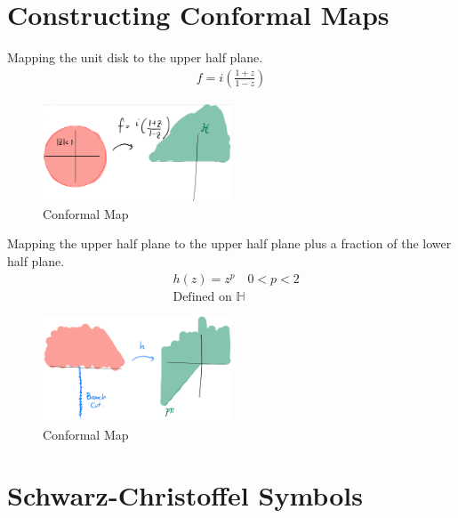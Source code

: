 \section{Constructing Conformal Maps}

\begin{example}

    Mapping the unit disk to the upper half plane.\\
    \begin{align*}
        f = i\left(\frac{1 + z}{1 - z}\right)
    \end{align*}
\end{example}

\begin{figure}[H]
    \centering
    \includegraphics[width=0.5\textwidth]{LECTURE_17/graph4.png}
    \caption{Conformal Map}
\end{figure}

\begin{example}
    Mapping the upper half plane to the upper half plane plus a fraction of the lower half plane.\\
    \begin{align*}
         & h(z) = z^p \quad 0 < p < 2    \\
         & \text{Defined on } \mathbb{H}
    \end{align*}

\end{example}

\begin{figure}[H]
    \centering
    \includegraphics[width=0.5\textwidth]{LECTURE_17/graph5.png}
    \caption{Conformal Map}
\end{figure}

\section{Schwarz-Christoffel Symbols}

